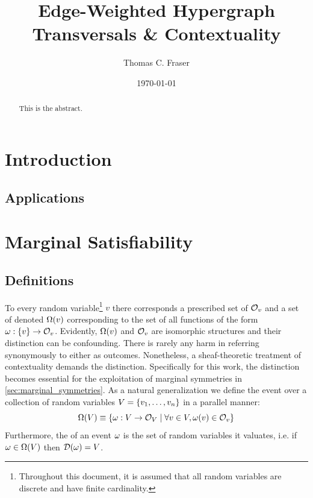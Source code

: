 \documentclass[aps, 10pt, english, twoside, twocolumn, pra, nofootinbib, tightenlines, longbibliography, superscriptaddress]{revtex4-1}
\begin{document}
    \title{Edge-Weighted Hypergraph Transversals \& Contextuality}
    \author{Thomas C. Fraser}
    \date{\today}
    \begin{abstract}
        This is the abstract.
    \end{abstract}
    \maketitle
    \tableofcontents

    \section{Introduction}
    \subsection{Applications}

    \section{Marginal Satisfiability}
    \subsection{Definitions}
    To every random variable\footnote{Throughout this document, it is assumed that all random variables are discrete and have finite cardinality.} $v$ there corresponds a prescribed set of  $\mathcal{O}_{v}$ and a set of  denoted $\events{v}$ corresponding to the set of all functions of the form $\w : \bc{v} \to \outcomes{v}$. Evidently, $\events{v}$ and $\mathcal{O}_{v}$ are isomorphic structures and their distinction can be confounding. There is rarely any harm in referring synonymously to either as outcomes. Nonetheless, a sheaf-theoretic treatment of contextuality \cite{Abramsky_2011} demands the distinction. Specifically for this work, the distinction becomes essential for the exploitation of marginal symmetries in \cref{sec:marginal_symmetries}. As a natural generalization we define the event over a collection of random variables $V = \bc{v_1, \ldots, v_n}$ in a parallel manner:
    \[ \events{V} \defined \bc{\w : V \to \outcomes{V} \mid \forall v \in V, \w\br{v} \in \outcomes{v}} \]
    Furthermore, the  of an event $\omega$ is the set of random variables it valuates, i.e. if $\w \in \events{V}$ then $\domain{\w} = V$.
\end{document}
